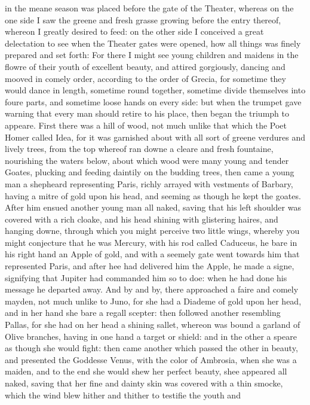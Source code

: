 in the meane season was placed before the gate of the Theater, whereas on the
one side I saw the greene and fresh grasse growing before the entry thereof,
whereon I greatly desired to feed: on the other side I conceived a great
delectation to see when the Theater gates were opened, how all things was
finely prepared and set forth: For there I might see young children and maidens
in the flowre of their youth of excellent beauty, and attired gorgiously,
dancing and mooved in comely order, according to the order of Grecia, for
sometime they would dance in length, sometime round together, sometime divide
themselves into foure parts, and sometime loose hands on every side: but when
the trumpet gave warning that every man should retire to his place, then began
the triumph to appeare. First there was a hill of wood, not much unlike that
which the Poet Homer called Idea, for it was garnished about with all sort of
greene verdures and lively trees, from the top whereof ran downe a cleare and
fresh fountaine, nourishing the waters below, about which wood were many young
and tender Goates, plucking and feeding daintily on the budding trees, then
came a young man a shepheard representing Paris, richly arrayed with vestments
of Barbary, having a mitre of gold upon his head, and seeming as though he kept
the goates. After him ensued another young man all naked, saving that his left
shoulder was covered with a rich cloake, and his head shining with glistering
haires, and hanging downe, through which you might perceive two little wings,
whereby you might conjecture that he was Mercury, with his rod called Caduceus,
he bare in his right hand an Apple of gold, and with a seemely gate went
towards him that represented Paris, and after hee had delivered him the Apple,
he made a signe, signifying that Jupiter had commanded him so to doe: when he
had done his message he departed away. And by and by, there approached a faire
and comely mayden, not much unlike to Juno, for she had a Diademe of gold upon
her head, and in her hand she bare a regall scepter: then followed another
resembling Pallas, for she had on her head a shining sallet, whereon was bound
a garland of Olive branches, having in one hand a target or shield: and in the
other a speare as though she would fight: then came another which passed the
other in beauty, and presented the Goddesse Venus, with the color of Ambrosia,
when she was a maiden, and to the end she would shew her perfect beauty, shee
appeared all naked, saving that her fine and dainty skin was covered with a
thin smocke, which the wind blew hither and thither to testifie the youth and
